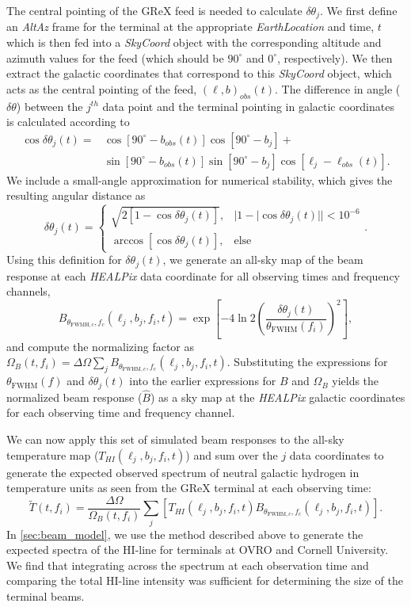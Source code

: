 The central pointing of the GReX feed is needed to calculate $\delta\theta_j$.
We first define an \textit{AltAz} frame for the terminal at the appropriate \textit{EarthLocation} and time, $t$ which is then fed into a \textit{SkyCoord} object with the corresponding altitude and azimuth values for the feed (which should be $90^\circ$ and $0^\circ$, respectively). 
We then extract the galactic coordinates that correspond to this \textit{SkyCoord} object, which acts as the central pointing of the feed, $(\ell,b)_{obs}(t)$. 
The difference in angle ($\delta\theta$) between the $j^{th}$ data point and the terminal pointing in galactic coordinates is calculated according to 
\begin{align*}
    \cos{\delta\theta_j(t)} = &\cos{[90^\circ-b_{obs}(t)]}\cos{[90^\circ-b_j]} + \\&\sin{[90^\circ-b_{obs}(t)]}\sin{[90^\circ-b_j]}\cos{[\ell_j-\ell_{obs}(t)]}.
\end{align*}
We include a small-angle approximation for numerical stability, which gives the resulting angular distance as 
\begin{equation*}
    \delta\theta_{j}(t) = 
    \begin{cases}
        \sqrt{2[1-\cos\delta\theta_j(t)]},& |1-|\cos\delta\theta_j(t)||<10^{-6}\\
        \arccos{[\cos\delta\theta_j(t)]},& \text{else}
    \end{cases}.
\end{equation*}
Using this definition for $\delta\theta_j(t)$, we generate an all-sky map of the beam response at each \textit{HEALPix} data coordinate for all observing times and frequency channels,
\begin{equation*}
    B_{\theta_{\text{FWMH}, c},f_c}(\ell_j,b_j,f_i,t)=\exp{\left[-4\ln2\left(\frac{\delta\theta_j(t)}{\theta_\text{FWHM}(f_i)}\right)^2\right]},
\end{equation*}
and compute the normalizing factor as $\Omega_B(t,f_i)=\Delta\Omega\sum_jB_{\theta_{\text{FWHM},c},f_c}(\ell_j,b_j,f_i,t)$.
Substituting the expressions for $\theta_\text{FWHM}(f)$ and $\delta\theta_j(t)$ into the earlier expressions for $B$ and $\Omega_B$ yields the normalized beam response ($\hat{B}$) as a sky map at the \textit{HEALPix} galactic coordinates for each observing time and frequency channel.

We can now apply this set of simulated beam responses to the all-sky temperature map ($T_{HI}(\ell_j,b_j,f_i,t)$) and sum over the $j$ data coordinates to generate the expected observed spectrum of neutral galactic hydrogen in temperature units as seen from the GReX terminal at each observing time:
\begin{equation*}
    \widetilde{T}(t,f_i) = \frac{\Delta\Omega}{\Omega_B(t,f_i)}\sum_j \left[T_{HI}(\ell_j,b_j,f_i,t)B_{\theta_{\text{FWHM},c},f_c}(\ell_j,b_j,f_i,t)\right].
\end{equation*}
In \autoref{sec:beam_model}, we use the method described above to generate the expected spectra of the HI-line for terminals at OVRO and Cornell University. 
We find that integrating across the spectrum at each observation time and comparing the total HI-line intensity was sufficient for determining the size of the terminal beams. 
